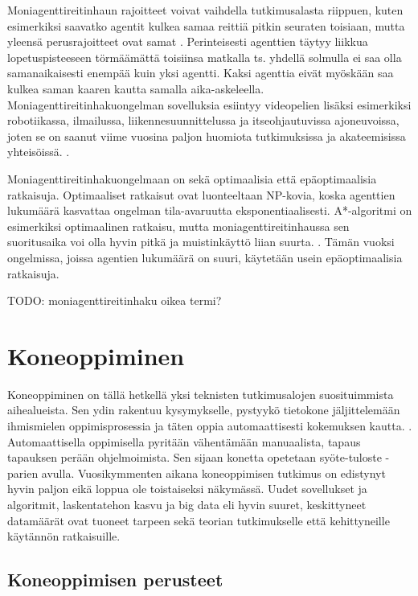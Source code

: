 \documentclass[utf8]{gradu3}
\begin{document}
Moniagenttireitinhaun rajoitteet voivat vaihdella tutkimusalasta riippuen, kuten esimerkiksi saavatko agentit kulkea samaa reittiä pitkin seuraten toisiaan, mutta yleensä perusrajoitteet ovat samat \parencite{sharon2015conflict,stern2019multi}. Perinteisesti agenttien täytyy liikkua lopetuspisteeseen törmäämättä toisiinsa matkalla ts. yhdellä solmulla ei saa olla samanaikaisesti enempää kuin yksi agentti. Kaksi agenttia eivät myöskään saa kulkea saman kaaren kautta samalla aika-askeleella. Moniagenttireitinhakuongelman sovelluksia esiintyy videopelien lisäksi esimerkiksi robotiikassa, ilmailussa, liikennesuunnittelussa ja itseohjautuvissa ajoneuvoissa, joten se on saanut viime vuosina paljon huomiota tutkimuksissa ja akateemisissa yhteisöissä. \parencite{sharon2015conflict,stern2019multi}.

Moniagenttireitinhakuongelmaan on sekä optimaalisia että epäoptimaalisia ratkaisuja. Optimaaliset ratkaisut ovat luonteeltaan NP-kovia, koska agenttien lukumäärä kasvattaa ongelman tila-avaruutta eksponentiaalisesti. A*-algoritmi on esimerkiksi optimaalinen ratkaisu, mutta moniagenttireitinhaussa sen suoritusaika voi olla hyvin pitkä ja muistinkäyttö liian suurta. \parencite{sharon2015conflict}. Tämän vuoksi ongelmissa, joissa agentien lukumäärä on suuri, käytetään usein epäoptimaalisia ratkaisuja. 

TODO: moniagenttireitinhaku oikea termi?

\chapter{Koneoppiminen}

Koneoppiminen on tällä hetkellä yksi teknisten tutkimusalojen suosituimmista aihealueista. Sen ydin rakentuu kysymykselle, pystyykö tietokone jäljittelemään ihmismielen oppimisprosessia ja täten oppia automaattisesti kokemuksen kautta. \parencite{das2017survey,jordan2015machine}. Automaattisella oppimisella pyritään vähentämään manuaalista, tapaus tapauksen perään ohjelmoimista. Sen sijaan konetta opetetaan syöte-tuloste -parien avulla. Vuosikymmenten aikana koneoppimisen tutkimus on edistynyt hyvin paljon eikä loppua ole toistaiseksi näkymässä. Uudet sovellukset ja algoritmit, laskentatehon kasvu ja big data eli hyvin suuret, keskittyneet datamäärät ovat tuoneet tarpeen sekä teorian tutkimukselle että kehittyneille käytännön ratkaisuille.

\section{Koneoppimisen perusteet}
\end{document}
